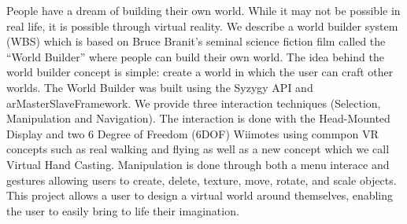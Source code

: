 People have a dream of building their own world. While it may not be possible in real life, it is possible through virtual reality.
We describe a world builder system (WBS) which is based on Bruce Branit's seminal science fiction film called the ``World Builder'' where people can build their own world.
The idea behind the world builder concept is simple: create a world in which the user can craft other worlds.
The World Builder was built using the Syzygy API and arMasterSlaveFramework.
We provide three interaction techniques (Selection, Manipulation and Navigation).
The interaction is done with the Head-Mounted Display and two 6 Degree of Freedom (6DOF) Wiimotes using commpon VR concepts such as real walking and flying as well as a new concept which we call Virtual Hand Casting.
Manipulation is done through both a menu interace and gestures allowing users to create, delete, texture, move, rotate, and scale objects.
This project allows a user to design a virtual world around themselves, enabling the user to easily bring to life their imagination.
